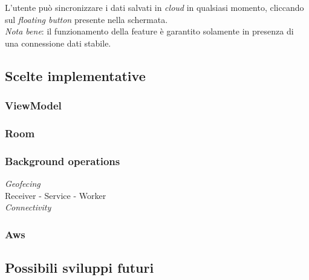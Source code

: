 \documentclass{article}
\begin{document}
L'utente può sincronizzare i dati salvati in \textit{cloud} in qualsiasi momento, cliccando sul \textit{floating button} presente nella schermata. \vspace*{7pt}\\
\textit{Nota bene}: il funzionamento della feature è garantito solamente in presenza di una connessione dati stabile.
\newpage
\begin{figure}[h]
    \centering
\end{figure}

\newpage
\subsection*{Scelte implementative}
\subsubsection*{ViewModel}
\subsubsection*{Room}
\subsubsection*{Background operations}
\textit{Geofecing} \\
Receiver - Service - Worker \\
\textit{Connectivity} \\
\subsubsection*{Aws}

\subsection*{Possibili sviluppi futuri}
\end{document}
